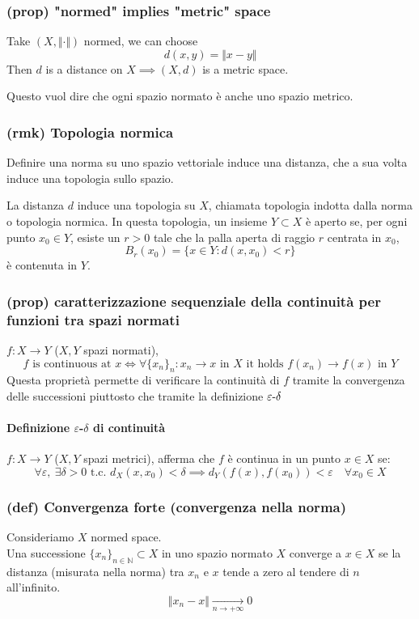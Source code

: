 \subsubsection{(prop) "normed" implies "metric" space}
Take $(X,\Vert \cdot \Vert )$ normed, we can choose $$d(x,y)=\Vert x-y\Vert$$
Then $d$ is a distance on $X\implies (X,d)$ is a metric space.

Questo vuol dire che ogni spazio normato è anche uno spazio metrico.
\subsubsection{(rmk) Topologia normica}
Definire una norma su uno spazio vettoriale induce una distanza, che a sua volta induce una topologia sullo spazio.

La distanza $d$ induce una topologia su $X$, chiamata topologia indotta dalla norma o topologia normica. In questa topologia, un insieme $Y\subset X$ è aperto se, per ogni punto $x_0\in Y$, esiste un $r>0$ tale che la palla aperta di raggio $r$ centrata in $x_0$,
$$B_r(x_0)=\{x\in Y:d(x,x_0)<r\}$$
è contenuta in $Y$.
\subsubsection{(prop) caratterizzazione sequenziale della continuità per funzioni tra spazi normati}
 $f:X\to Y$ ($X,Y$ spazi normati),
    $$f\text{ is continuous at }x \iff \forall \{x_n\}_n:x_n\to x \text{ in } X \text{ it holds } f(x_n)\to f(x) \text{ in } Y$$
Questa proprietà permette di verificare la continuità di $f$ tramite la convergenza delle successioni piuttosto che tramite la definizione $\varepsilon\text-\delta$
\paragraph{Definizione $\varepsilon$-$\delta$ di continuità}
 $f:X\to Y$ ($X,Y$ spazi metrici), afferma che $f$ è continua in un punto $x\in X$ se:
 $$\forall \varepsilon, \ \exists\delta >0 \text{ t.c. }d_X(x,x_0)<\delta \implies d_Y(f(x),f(x_0))<\varepsilon \quad \forall x_0\in X$$

\subsubsection{(def) Convergenza forte (convergenza nella norma)}
Consideriamo $X$ normed space.\\
Una successione $\{x_n\}_{n\in \mathbb N}\subset X$ in uno spazio normato $X$ converge a $x\in X$ se la distanza (misurata nella norma) tra $x_n$ e $x$ tende a zero al tendere di $n$ all'infinito.
$$\Vert x_n-x\Vert\xrightarrow[n\to+\infty]{}0$$
